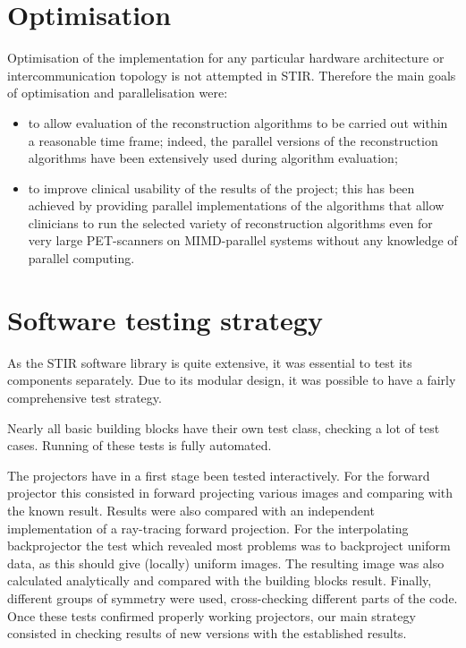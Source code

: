 \documentclass{article}
\begin{document}
\section{
Optimisation}

Optimisation of the implementation for any particular hardware 
architecture or intercommunication topology is not attempted 
in STIR. Therefore the main goals of optimisation and parallelisation 
were:
\begin{itemize}
\item to allow evaluation of the reconstruction algorithms to be 
carried out within a reasonable time frame; indeed, the parallel 
versions of the reconstruction algorithms have been extensively 
used during algorithm evaluation;
\item to improve clinical usability of the results of the project; 
this has been achieved by providing parallel implementations 
of the algorithms that allow clinicians to run the selected variety 
of reconstruction algorithms even for very large PET-scanners 
on MIMD-parallel systems without any knowledge of parallel computing.
\end{itemize}


\section{
Software testing strategy}

As the STIR software library is quite extensive, it was essential 
to test its components separately. Due to its modular design, 
it was possible to have a fairly comprehensive test strategy.

Nearly all basic building blocks have their own test class, checking 
a lot of test cases. Running of these tests is fully automated.

The projectors have in a first stage been tested interactively. 
For the forward projector this consisted in forward projecting 
various images and comparing with the known result. Results were 
also compared with an independent implementation of a ray-tracing 
forward projection. For the interpolating backprojector the test 
which revealed most problems was to backproject uniform data, 
as this should give (locally) uniform images. The resulting image 
was also calculated analytically and compared with the building 
blocks result. Finally, different groups of symmetry were used, 
cross-checking different parts of the code. Once these tests 
confirmed properly working projectors, our main strategy consisted 
in checking results of new versions with the established results.
\end{document}
